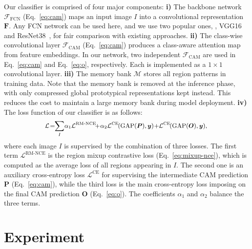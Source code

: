 \documentclass[10pt,twocolumn,letterpaper]{article}
\begin{document}
Our classifier is comprised of four major components: \textbf{i)} The {backbone network} $\mathcal{F}_{\text{FCN}}$ (Eq.~\ref{eq:cam}) maps an input image $I$ into a convolutional representation $\bm{F}$. Any FCN network can be used here, and we use two popular ones,  \ie, VGG16~\cite{simonyan2014very} and ResNet38~\cite{he2016deep}, for fair comparison with existing approaches. \textbf{ii)} The {class-wise convolutional layer} $\mathcal{F}_{\text{CAM}}$ (Eq.~\ref{eq:cam})  produces a class-aware attention map from feature embeddings. In our network, two independent $\mathcal{F}_{\text{CAM}}$ are used in Eq.~\ref{eq:cam} and Eq.~\ref{eq:o}, respectively. Each  is implemented as a $1{\times}1$ convolutional layer. \textbf{iii)} The {memory bank} $\mathcal{M}$  stores all region patterns in training data. Note that the memory bank is  removed at the inference phase, with only compressed global prototypical representations kept instead. This reduces the cost to maintain a large memory bank  during model deployment. \textbf{iv)} The loss function of our classifier is as follows:
	\vspace{-3pt}
	\begin{equation}\small\label{eq:loss}
		\begin{aligned}
		\!\!\!\!\!\!\!\mathcal{L} \!=\!\! \sum_{I} &\alpha_1\mathcal{L}^{\text{RM-NCE}\!\!} \!+\! \alpha_2\mathcal{L}^{\text{CE}\!} (\text{GAP}(\bm{P}), \bm{y}) \!+_{\!}\! \mathcal{L}^{\text{CE}\!} (\text{GAP}(\bm{O}), \bm{y}),\!\!\!\!\!\!\!\!\!\!\!\!
		\end{aligned}
			\vspace{-1pt}
	\end{equation}
	where each image $I$ is supervised by the combination of three losses. The first term $\mathcal{L}^{\text{RM-NCE}}$ is the region mixup contrastive loss (Eq.~\ref{eq:mixup-nce}), which is computed as the average loss of all regions appearing in $I$. The second one is {an auxiliary cross-entropy loss} $\mathcal{L}^{\text{CE}}$ for supervising the intermediate CAM prediction $\bm{P}$ (Eq.~\ref{eq:cam}), while the third loss is the main cross-entropy loss  imposing on the final CAM prediction ${\bm{O}}$ (Eq.~\ref{eq:o}).  The coefficients $\alpha_1$ and $\alpha_2$ balance the three  terms.
	
	



\section{Experiment}
\end{document}
